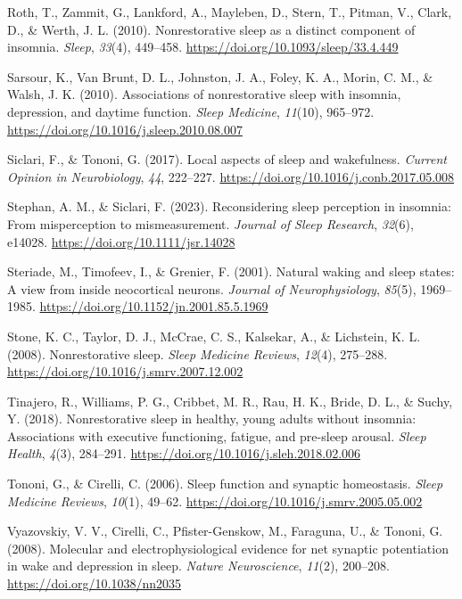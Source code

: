\documentclass[
]{article}
\newlength{\cslhangindent}
\newenvironment{CSLReferences}[2] %
 {\begin{list}{}{%
  \setlength{\itemindent}{0pt}
  \setlength{\leftmargin}{0pt}
  \setlength{\parsep}{0pt}
  \ifodd #1
   \setlength{\leftmargin}{\cslhangindent}
   \setlength{\itemindent}{-1\cslhangindent}
  \fi
  \setlength{\itemsep}{#2\baselineskip}}}
 {\end{list}}
\begin{document}
\begin{CSLReferences}{1}{0}
Roth, T., Zammit, G., Lankford, A., Mayleben, D., Stern, T., Pitman, V.,
Clark, D., \& Werth, J. L. (2010). Nonrestorative sleep as a distinct
component of insomnia. \emph{Sleep}, \emph{33}(4), 449--458.
\url{https://doi.org/10.1093/sleep/33.4.449}

Sarsour, K., Van Brunt, D. L., Johnston, J. A., Foley, K. A., Morin, C.
M., \& Walsh, J. K. (2010). Associations of nonrestorative sleep with
insomnia, depression, and daytime function. \emph{Sleep Medicine},
\emph{11}(10), 965--972.
\url{https://doi.org/10.1016/j.sleep.2010.08.007}

Siclari, F., \& Tononi, G. (2017). Local aspects of sleep and
wakefulness. \emph{Current Opinion in Neurobiology}, \emph{44},
222--227. \url{https://doi.org/10.1016/j.conb.2017.05.008}

Stephan, A. M., \& Siclari, F. (2023). Reconsidering sleep perception in
insomnia: {From} misperception to mismeasurement. \emph{Journal of Sleep
Research}, \emph{32}(6), e14028. \url{https://doi.org/10.1111/jsr.14028}

Steriade, M., Timofeev, I., \& Grenier, F. (2001). Natural waking and
sleep states: {A} view from inside neocortical neurons. \emph{Journal of
Neurophysiology}, \emph{85}(5), 1969--1985.
\url{https://doi.org/10.1152/jn.2001.85.5.1969}

Stone, K. C., Taylor, D. J., McCrae, C. S., Kalsekar, A., \& Lichstein,
K. L. (2008). Nonrestorative sleep. \emph{Sleep Medicine Reviews},
\emph{12}(4), 275--288. \url{https://doi.org/10.1016/j.smrv.2007.12.002}

Tinajero, R., Williams, P. G., Cribbet, M. R., Rau, H. K., Bride, D. L.,
\& Suchy, Y. (2018). Nonrestorative sleep in healthy, young adults
without insomnia: Associations with executive functioning, fatigue, and
pre-sleep arousal. \emph{Sleep Health}, \emph{4}(3), 284--291.
\url{https://doi.org/10.1016/j.sleh.2018.02.006}

Tononi, G., \& Cirelli, C. (2006). Sleep function and synaptic
homeostasis. \emph{Sleep Medicine Reviews}, \emph{10}(1), 49--62.
\url{https://doi.org/10.1016/j.smrv.2005.05.002}

Vyazovskiy, V. V., Cirelli, C., Pfister-Genskow, M., Faraguna, U., \&
Tononi, G. (2008). Molecular and electrophysiological evidence for net
synaptic potentiation in wake and depression in sleep. \emph{Nature
Neuroscience}, \emph{11}(2), 200--208.
\url{https://doi.org/10.1038/nn2035}


\end{CSLReferences}
\end{document}
